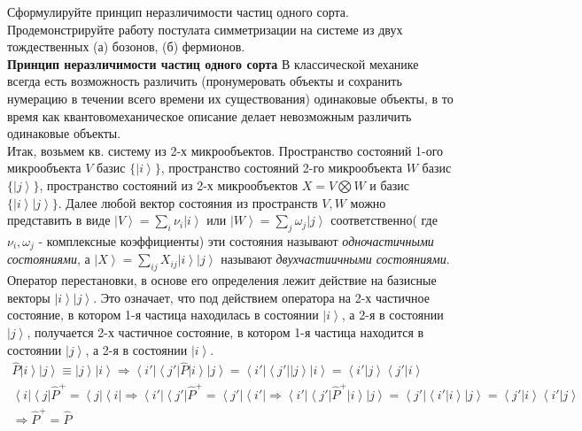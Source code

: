 \documentclass[__main__.tex]{subfiles}
\begin{document}
Сформулируйте принцип неразличимости частиц одного сорта. Продемонстрируйте работу постулата симметризации на системе из двух тождественных (а) бозонов, (б) фермионов.\\

\textbf{Принцип неразличимости частиц одного сорта}
В классической механике всегда есть возможность различить (пронумеровать объекты и сохранить нумерацию в течении всего времени их существования) одинаковые объекты, в то время как квантовомеханическое описание делает невозможным различить одинаковые объекты.\\
Итак, возьмем кв. систему из 2-х микрообъектов. Пространство состояний 1-ого микрообъекта $V$ базис $\{\left|i\right>\}$, пространство состояний 2-го микрообъекта $W$ базис $\{\left|j\right>\}$, пространство состояний из 2-х микрообъектов $X = V \bigotimes W$ и базис $\{\left| i \right> \left| j \right>\}$. Далее любой вектор состояния из пространств $V,W$ можно представить в виде $\left| V \right> = \sum_i \nu_i \left| i \right>$ или  $\left| W \right> = \sum_j \omega_j \left| j \right>$ соответственно( где $\nu_i, \omega_j$ - комплексные коэффициенты) эти состояния называют \textit{одночастичными состояниями}, а  $\left| X \right> = \sum_{ij} X_{ij} \left| i \right> \left| j \right>$ называют \textit{двухчастиичными состояниями}.\\
Оператор перестановки, в основе его определения лежит действие на базисные векторы $\left| i \right> \left| j \right>$. Это означает, что под действием оператора на 2-х частичное состояние, в котором 1-я частица находилась в состоянии $\left| i \right>$, а 2-я в состоянии $\left| j \right>$, получается 2-х частичное состояние, в котором 1-я частица находится в состоянии $\left| j \right>$, а 2-я в состоянии $\left| i \right>$.\\
\begin{gather*}
    \hat{P}\left|i\right>\left|j\right>
    \equiv
    \left|j\right>\left|i\right>
    \Longrightarrow
    \left< i'\right|\left<j'\right|\hat{P}\left|i\right>\left|j\right>
    =
    \left<i'\right|\left<j'\right|\left|j\right>\left|i \right>
    =
    \left< i'|j\right>\left<j'|i \right>\\
    \left<i\right|\left<j\right|\hat{P}^+
    =
    \left<j\right|\left<i\right|
    \Longrightarrow
    \left< i'\right|\left<j'\right|\hat{P}^+
    =
    \left<j'\right|\left<i'\right|
    \Longrightarrow
    \left< i'\right|\left<j'\right|\hat{P}^+\left|i\right>\left|j\right>
    =
    \left< j'\right|\left<i'|i\right>\left|j\right>
    =
    \left< j'|i\right>\left<i'|j \right>\\
    \Longrightarrow \hat{P}^+=\hat{P}
\end{gather*}
\end{document}
